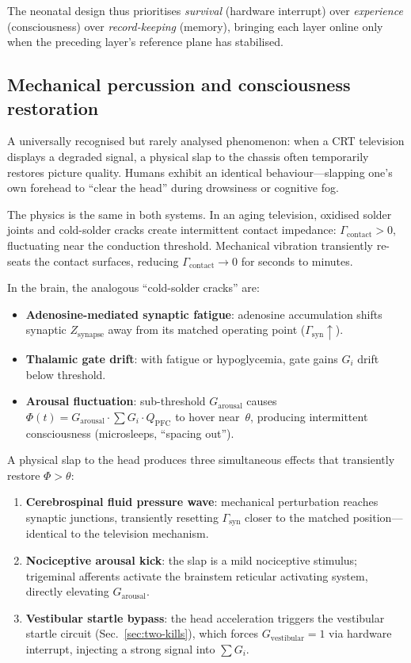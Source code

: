 \documentclass[aps,pre,twocolumn,superscriptaddress,floatfix]{revtex4-2}
\begin{document}
The neonatal design thus prioritises \emph{survival}
(hardware interrupt) over \emph{experience}
(consciousness) over \emph{record-keeping} (memory),
bringing each layer online only when the preceding
layer's reference plane has stabilised.

\subsection{Mechanical percussion and consciousness
  restoration}
\label{sec:percussion}

A universally recognised but rarely analysed phenomenon:
when a CRT television displays a degraded signal, a
physical slap to the chassis often temporarily restores
picture quality.
Humans exhibit an identical behaviour---slapping one's
own forehead to ``clear the head'' during drowsiness or
cognitive fog.

The physics is the same in both systems.
In an aging television, oxidised solder joints and
cold-solder cracks create intermittent contact impedance:
$\Gamma_{\text{contact}}>0$, fluctuating near the
conduction threshold.
Mechanical vibration transiently re-seats the contact
surfaces, reducing $\Gamma_{\text{contact}}\to 0$ for
seconds to minutes.

In the brain, the analogous ``cold-solder cracks'' are:
\begin{itemize}
  \item \textbf{Adenosine-mediated synaptic fatigue}:
    adenosine accumulation shifts synaptic
    $Z_{\text{synapse}}$ away from its matched
    operating point ($\Gamma_{\text{syn}}\uparrow$).
  \item \textbf{Thalamic gate drift}: with fatigue or
    hypoglycemia, gate gains $G_i$ drift below threshold.
  \item \textbf{Arousal fluctuation}: sub-threshold
    $G_{\text{arousal}}$ causes
    $\Phi(t)=G_{\text{arousal}}\cdot\sum G_i\cdot Q_{\text{PFC}}$
    to hover near~$\theta$, producing intermittent
    consciousness (microsleeps, ``spacing out'').
\end{itemize}

A physical slap to the head produces three simultaneous
effects that transiently restore $\Phi>\theta$:
\begin{enumerate}
  \item \textbf{Cerebrospinal fluid pressure wave}:
    mechanical perturbation reaches synaptic junctions,
    transiently resetting $\Gamma_{\text{syn}}$ closer
    to the matched position---identical to the television
    mechanism.
  \item \textbf{Nociceptive arousal kick}:
    the slap is a mild nociceptive stimulus;
    trigeminal afferents activate the brainstem
    reticular activating system, directly elevating
    $G_{\text{arousal}}$.
  \item \textbf{Vestibular startle bypass}:
    the head acceleration triggers the vestibular
    startle circuit (Sec.~\ref{sec:two-kills}),
    which forces $G_{\text{vestibular}}=1$ via
    hardware interrupt, injecting a strong signal
    into $\sum G_i$.
\end{enumerate}
\end{document}

